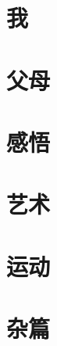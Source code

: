 \documentclass[10pt]{ctexbook}
\begin{document}

\frontmatter

\tableofcontents
\mainmatter


\part{我}




\part{父母}




\part{感悟}






\part{艺术}


\part{运动}





\part{杂篇}




\backmatter
\end{document}
